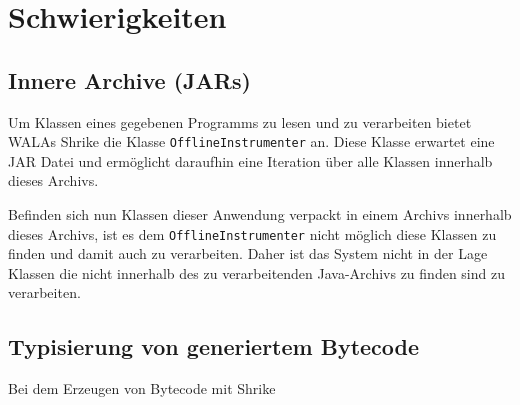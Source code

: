 \section{Schwierigkeiten}

\subsection{Innere Archive (JARs)}

Um Klassen eines gegebenen Programms zu lesen und zu verarbeiten bietet WALAs Shrike die Klasse
\texttt{OfflineInstrumenter} an. Diese Klasse erwartet eine JAR Datei und ermöglicht daraufhin
eine Iteration über alle Klassen innerhalb dieses Archivs. 

Befinden sich nun Klassen dieser Anwendung verpackt in einem Archivs innerhalb dieses Archivs,
ist es dem \texttt{OfflineInstrumenter} nicht möglich diese Klassen zu finden und damit auch zu verarbeiten. 
Daher ist das System nicht in der Lage Klassen die nicht innerhalb des zu verarbeitenden Java-Archivs zu finden 
sind zu verarbeiten.

\subsection{Typisierung von generiertem Bytecode} 

Bei dem Erzeugen von Bytecode mit Shrike 

